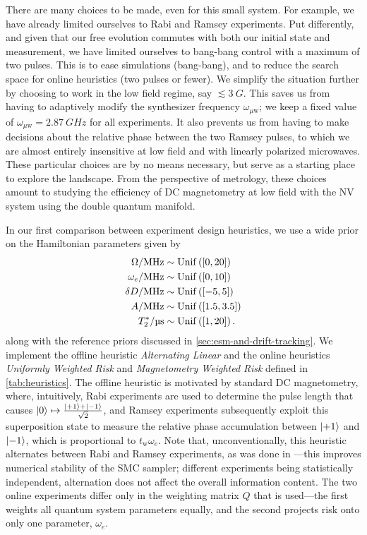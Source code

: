 \documentclass[aps,nofootinbib,twocolumn,superscriptaddress]{revtex4}
\newcommand{\tw}{t_\text{w}}
\newcommand{\uw}{{\mu\text{w}}}
\begin{document}
There are many choices to be made, even for this small system.
For example, we have already limited ourselves to Rabi and 
Ramsey experiments.
Put differently, and given that our free evolution commutes with 
both our initial state and measurement, 
we have limited ourselves to bang-bang control
with a maximum of two pulses.
This is to ease simulations (bang-bang), and to reduce the
search space for online heuristics (two pulses or fewer).
We simplify the situation further by choosing to work in the low field
regime, say $\lesssim\SI{3}{G}$.
This saves us from having to adaptively modify the synthesizer 
frequency $\omega_\uw$; we keep a fixed value of 
$\omega_\uw=\SI{2.87}{GHz}$ for all experiments.
It also
prevents us from having to make decisions about the relative
phase between the two Ramsey pulses, to which we are
almost entirely insensitive at low field and with linearly
polarized microwaves.
These particular choices are by no means necessary, but serve
as a starting place to explore the landscape.
From the perspective of metrology, these choices amount to studying
the efficiency of DC magnetometry at low field with the NV system using
the double quantum manifold.

In our first comparison between experiment design heuristics, 
we use a wide prior on the Hamiltonian 
parameters given by
\begin{subequations}
\begin{align}
    \Omega/\si{MHz} 
        &\sim \uniformdist\left( [0, 20] \right) \\
    \omega_e/\si{MHz} 
        &\sim \uniformdist\left( [0, 10] \right) \\
    \delta D/\si{MHz} 
        &\sim \uniformdist\left( [-5, 5] \right) \\
    A/\si{MHz} 
        &\sim \uniformdist\left( [1.5, 3.5] \right) \\
    T_2^*/\si{\micro\second} 
        &\sim \uniformdist\left( [1, 20] \right).
\end{align}
\label{eq:wide-prior}
\end{subequations}
along with the reference priors discussed in 
\autoref{sec:esm-and-drift-tracking}.
We implement the offline heuristic \textit{Alternating Linear} and the
online heuristics \textit{Uniformly Weighted Risk} and
\textit{Magnetometry Weighted Risk}
defined in \autoref{tab:heuristics}.
The offline heuristic is motivated by standard DC magnetometry,
where, intuitively, Rabi experiments are used to determine the pulse length
that causes $\ket{0}\mapsto\frac{\ket{+1}+\ket{-1}}{\sqrt{2}}$, 
and Ramsey experiments subsequently exploit  this superposition state
to measure the relative
phase accumulation between $\ket{+1}$ and $\ket{-1}$, which is
proportional to $\tw \omega_e$.
Note that, unconventionally, this heuristic alternates between 
Rabi and Ramsey experiments, as was done in \cite{hincks_statistical_2018}---this improves 
numerical stability of the SMC sampler; different
experiments being statistically independent, alternation 
does not affect the overall information content.
The two online experiments differ only in the weighting matrix $Q$ that is used---the
first weights all quantum system parameters equally, and the second projects risk
onto only one parameter, $\omega_e$.
\end{document}
